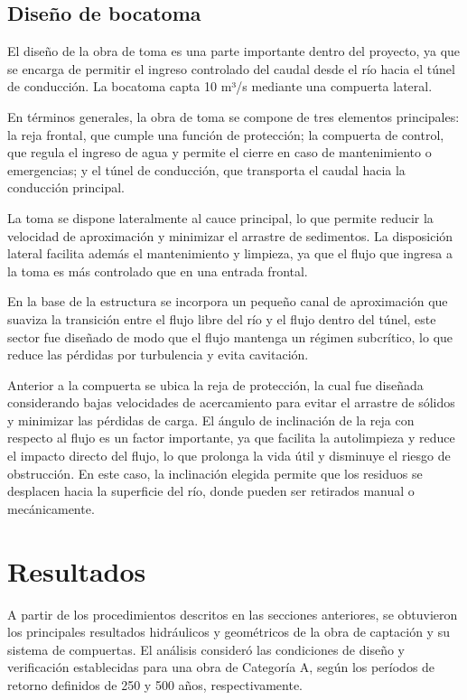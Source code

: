 \documentclass{article} %
\begin{document}
\subsection{Diseño de bocatoma}
El diseño de la obra de toma es una parte importante dentro del proyecto, ya que se  encarga de permitir el ingreso controlado del caudal desde el río hacia el túnel de conducción. La bocatoma capta 10 m³/s mediante una compuerta lateral.

En términos generales, la obra de toma se compone de tres elementos principales: la reja frontal, que cumple una función de protección; la compuerta de control, que regula el ingreso de agua y permite el cierre en caso de mantenimiento o emergencias; y el túnel de conducción, que transporta el caudal hacia la conducción principal.

La toma se dispone lateralmente al cauce principal, lo que permite reducir la velocidad de aproximación y minimizar el arrastre de sedimentos. La disposición lateral facilita además el mantenimiento y limpieza, ya que el flujo que ingresa a la toma es más controlado que en una entrada frontal.

En la base de la estructura se incorpora un pequeño canal de aproximación que suaviza la transición entre el flujo libre del río y el flujo dentro del túnel, este sector fue diseñado de modo que el flujo mantenga un régimen subcrítico, lo que reduce las pérdidas por turbulencia y evita cavitación.

Anterior a la compuerta se ubica la reja de protección, la cual fue diseñada considerando bajas velocidades de acercamiento para evitar el arrastre de sólidos y minimizar las pérdidas de carga. El ángulo de inclinación de la reja con respecto al flujo es un factor importante, ya que facilita la autolimpieza y reduce el impacto directo del flujo, lo que prolonga la vida útil y disminuye el riesgo de obstrucción. En este caso, la inclinación elegida permite que los residuos se desplacen hacia la superficie del río, donde pueden ser retirados manual o mecánicamente. 




\newpage
\section{Resultados}


A partir de los procedimientos descritos en las secciones anteriores, se obtuvieron los principales resultados hidráulicos y geométricos de la obra de captación y su sistema de compuertas. El análisis consideró las condiciones de diseño y verificación establecidas para una obra de Categoría A, según los períodos de retorno definidos de 250 y 500 años, respectivamente.
\end{document}
